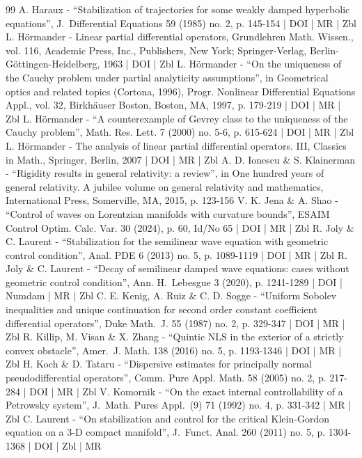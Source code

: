 \documentclass[10pt]{amsart}
\theoremstyle{definition}
\begin{document}
\begin{thebibliography}{99}
A. Haraux - “Stabilization of trajectories for some weakly damped hyperbolic equations”, J. Differential Equations 59 (1985) no. 2, p. 145-154 | DOI | MR | Zbl
L. Hörmander - Linear partial differential operators, Grundlehren Math. Wissen., vol. 116, Academic Press, Inc., Publishers, New York; Springer-Verlag, Berlin-Göttingen-Heidelberg, 1963 | DOI | Zbl
L. Hörmander - “On the uniqueness of the Cauchy problem under partial analyticity assumptions”, in Geometrical optics and related topics (Cortona, 1996), Progr. Nonlinear Differential Equations Appl., vol. 32, Birkhäuser Boston, Boston, MA, 1997, p. 179-219 | DOI | MR | Zbl
L. Hörmander - “A counterexample of Gevrey class to the uniqueness of the Cauchy problem”, Math. Res. Lett. 7 (2000) no. 5-6, p. 615-624 | DOI | MR | Zbl
L. Hörmander - The analysis of linear partial differential operators. III, Classics in Math., Springer, Berlin, 2007 | DOI | MR | Zbl
A. D. Ionescu \& S. Klainerman - “Rigidity results in general relativity: a review”, in One hundred years of general relativity. A jubilee volume on general relativity and mathematics, International Press, Somerville, MA, 2015, p. 123-156
V. K. Jena \& A. Shao - “Control of waves on Lorentzian manifolds with curvature bounds”, ESAIM Control Optim. Calc. Var. 30 (2024), p. 60, Id/No 65 | DOI | MR | Zbl
R. Joly \& C. Laurent - “Stabilization for the semilinear wave equation with geometric control condition”, Anal. PDE 6 (2013) no. 5, p. 1089-1119 | DOI | MR | Zbl
R. Joly \& C. Laurent - “Decay of semilinear damped wave equations: cases without geometric control condition”, Ann. H. Lebesgue 3 (2020), p. 1241-1289 | DOI | Numdam | MR | Zbl
C. E. Kenig, A. Ruiz \& C. D. Sogge - “Uniform Sobolev inequalities and unique continuation for second order constant coefficient differential operators”, Duke Math. J. 55 (1987) no. 2, p. 329-347 | DOI | MR | Zbl
R. Killip, M. Visan \& X. Zhang - “Quintic NLS in the exterior of a strictly convex obstacle”, Amer. J. Math. 138 (2016) no. 5, p. 1193-1346 | DOI | MR | Zbl
H. Koch \& D. Tataru - “Dispersive estimates for principally normal pseudodifferential operators”, Comm. Pure Appl. Math. 58 (2005) no. 2, p. 217-284 | DOI | MR | Zbl
V. Komornik - “On the exact internal controllability of a Petrowsky system”, J. Math. Pures Appl. (9) 71 (1992) no. 4, p. 331-342 | MR | Zbl
C. Laurent - “On stabilization and control for the critical Klein-Gordon equation on a 3-D compact manifold”, J. Funct. Anal. 260 (2011) no. 5, p. 1304-1368 | DOI | Zbl | MR

\end{thebibliography}
\end{document}
